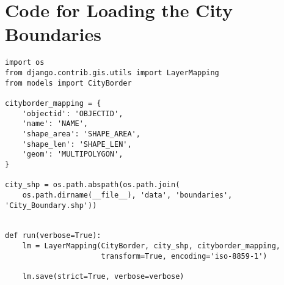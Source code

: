 \chapter{Code for Loading the City Boundaries}\label{code-loadmap}
\begin{small}
\begin{verbatim}
import os
from django.contrib.gis.utils import LayerMapping
from models import CityBorder

cityborder_mapping = {
    'objectid': 'OBJECTID',
    'name': 'NAME',
    'shape_area': 'SHAPE_AREA',
    'shape_len': 'SHAPE_LEN',
    'geom': 'MULTIPOLYGON',
}

city_shp = os.path.abspath(os.path.join(
    os.path.dirname(__file__), 'data', 'boundaries', 'City_Boundary.shp'))


def run(verbose=True):
    lm = LayerMapping(CityBorder, city_shp, cityborder_mapping,
                      transform=True, encoding='iso-8859-1')

    lm.save(strict=True, verbose=verbose)
\end{verbatim}
\end{small}